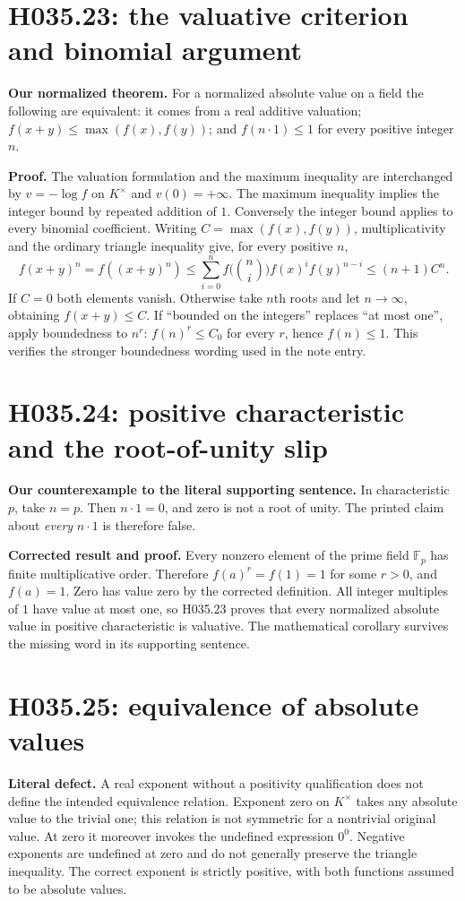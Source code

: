 \section{H035.23: the valuative criterion and binomial argument}
\textbf{Our normalized theorem.} For a normalized absolute value on
a field the following are equivalent: it comes from a real additive
valuation; $f(x+y)\leq\max(f(x),f(y))$; and $f(n\cdot1)\leq1$
for every positive integer $n$.

\textbf{Proof.} The valuation formulation and the maximum inequality
are interchanged by $v=-\log f$ on $K^\times$ and $v(0)=+\infty$.
The maximum inequality implies the integer bound by repeated addition
of $1$. Conversely the integer bound applies to every binomial
coefficient. Writing $C=\max(f(x),f(y))$, multiplicativity and the
ordinary triangle inequality give, for every positive $n$,
\[
 f(x+y)^n=f((x+y)^n)
 \leq\sum_{i=0}^n f\bigl({n\choose i}\bigr)f(x)^if(y)^{n-i}
 \leq(n+1)C^n.
\]
If $C=0$ both elements vanish. Otherwise take $n$th roots and let
$n\to\infty$, obtaining $f(x+y)\leq C$. If ``bounded on the
integers'' replaces ``at most one'', apply boundedness to $n^r$:
$f(n)^r\leq C_0$ for every $r$, hence $f(n)\leq1$. This verifies
the stronger boundedness wording used in the note entry.

\section{H035.24: positive characteristic and the root-of-unity slip}
\textbf{Our counterexample to the literal supporting sentence.}
In characteristic $p$, take $n=p$. Then $n\cdot1=0$, and zero is
not a root of unity. The printed claim about \emph{every} $n\cdot1$
is therefore false.

\textbf{Corrected result and proof.} Every nonzero element of the
prime field $\mathbb F_p$ has finite multiplicative order. Therefore
$f(a)^r=f(1)=1$ for some $r>0$, and $f(a)=1$. Zero has value zero
by the corrected definition. All integer multiples of $1$ have value
at most one, so H035.23 proves that every normalized absolute value
in positive characteristic is valuative. The mathematical corollary
survives the missing word in its supporting sentence.

\section{H035.25: equivalence of absolute values}
\textbf{Literal defect.} A real exponent without a positivity
qualification does not define the intended equivalence relation.
Exponent zero on $K^\times$ takes any absolute value to the trivial
one; this relation is not symmetric for a nontrivial original value.
At zero it moreover invokes the undefined expression $0^0$.
Negative exponents are undefined at zero and do not generally preserve
the triangle inequality. The correct exponent is strictly positive,
with both functions assumed to be absolute values.

